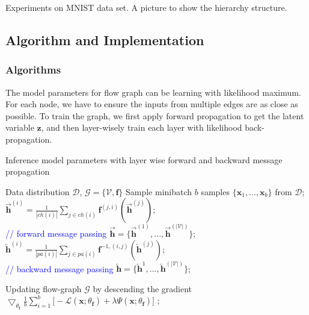 \documentclass[conference]{IEEEtran}
\begin{document}
Experiments on MNIST data set. A picture to show the hierarchy structure. 

\subsection{Algorithm and Implementation}

\subsubsection{Algorithms}
The model parameters for  flow graph can be learning with likelihood maximum.  For each node,  we have to ensure the  inputs from multiple edges are as close as possible.  To train the graph, we first apply forward propagation to get the latent variable $\mathbf{z}$, and then layer-wisely train each layer with likelihood back-propagation. 

\begin{algorithm}[h!]
   \caption{Inference model parameters with layer wise forward and backward message propagation}
   \label{alg:main}
\begin{algorithmic}
    Data distribution $\mathcal{D}$,  $\mathcal{G} = \{\mathcal{V}, \mathbf{f}\}$
   \REPEAT
   \STATE Sample minibatch $b$ samples $\{\mathbf{x}_1, ..., \mathbf{x}_b \}$ from $\mathcal{D}$;
   \STATE $\overrightarrow{\mathbf{h}}^{(i)} = \frac{1}{|ch(i)|} \sum_{j \in ch(i) } \mathbf{f}^{(j,i)}(\overrightarrow{\mathbf{h}}^{(j)})$; \\ \textcolor{blue}{// forward message passing}
   \ENDFOR
    \STATE  $ \overrightarrow{\mathbf{h}} =  \{\overrightarrow{\mathbf{h}}^{(1)}, ...,  \overrightarrow{\mathbf{h}}^{(|\mathcal{V}|)}  \}$;
   \STATE $\overleftarrow{\mathbf{h}}^{(i)} = \frac{1}{|pa(i)|} \sum_{j \in pa(i) } \mathbf{f}^{-1, (i,j)}(\overleftarrow{\mathbf{h}}^{(j)}) $; \\ \textcolor{blue}{// backward message passing}
   \ENDFOR
    \STATE  $ \overleftarrow{\mathbf{h}} =  \{\overleftarrow{\mathbf{h}}^{1}, ...,  \overleftarrow{\mathbf{h}}^{(|\mathcal{V}|)}  \}$;
    
    \STATE Updating flow-graph $\mathcal{G}$ by descending the gradient $\bigtriangledown_{\theta_{\mathbf{f}}}\frac{1}{b} \sum_{i=1}^b  \big[ -\mathcal{L}(\mathbf{x}; \theta_{\mathbf{f}} ) +\lambda \Psi(\mathbf{x}; \theta_{\mathbf{f}}) \big] $ ;
\end{algorithmic}
\end{algorithm}
\end{document}

